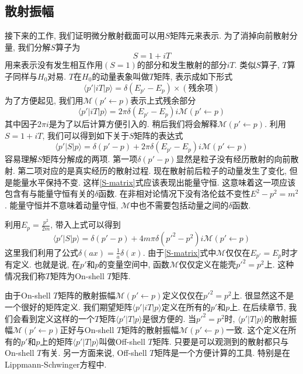 \documentclass[a4paper,11pt]{book}
\begin{document}
\subsection{散射振幅}
接下来的工作, 我们证明微分散射截面可以用$S$矩阵元来表示. 为了消掉向前散射分量, 我们分解$S$算子为
\begin{equation}
  S=1+iT
\end{equation}
用来表示没有发生相互作用$(S=1)$的部分和发生散射的部分$iT$. 类似$S$算子, $T$算子同样与$H_0$对易. $T$在$H_0$的动量表象叫做$T$矩阵, 表示成如下形式
\begin{equation}
  \langle p'|iT|p\rangle=\delta(E_{p'}-E_p)\times (\text{残余项})
\end{equation}
为了方便起见, 我们用$\mathcal{M}(p'\leftarrow p)$表示上式残余部分
\begin{equation}
  \langle p'|iT|p\rangle=2\pi\delta(E_{p'}-E_p)i\mathcal{M}(p'\leftarrow p)
\end{equation}
其中因子$2\pi i$是为了以后计算方便引入的. 稍后我们将会解释$\mathcal{M}(p'\leftarrow p)$. 利用$S=1+iT$, 我们可以得到如下关于$S$矩阵的表达式
\begin{equation}\label{S-matrix}
  \langle p'|S|p\rangle=\delta(p'-p)+2\pi \delta(E_{p'}-E_p)i\mathcal{M}(p'\leftarrow p)
\end{equation}
容易理解$S$矩阵分解成的两项. 第一项$\delta(p'-p)$显然是粒子没有经历散射的向前散射. 第二项对应的是真实经历的散射过程. 现在散射前后粒子的动量发生了变化, 但是能量水平保持不变. 这样\eqref{S-matrix}式应该表现出能量守恒. 这意味着这一项应该包含有与能量守恒有关的$\delta$函数. 在非相对论情况下没有洛伦兹不变性$E^2-p^2=m^2$. 能量守恒并不意味着动量守恒, $\mathcal{M}$中也不需要包括动量之间的$\delta$函数.

利用$E_p=\frac{p^2}{2m}$, 带入上式可以得到
\begin{equation}
  \langle p'|S|p\rangle=\delta(p'-p)+4m\pi \delta(p'^2-p^2)i\mathcal{M}(p'\leftarrow p)
\end{equation}
这里我们利用了公式$\delta(ax)=\frac{1}{a}\delta(x)$. 由于\eqref{S-matrix}式中$\mathcal{M}$仅仅在$E_{p'}=E_p$时才有定义. 也就是说, 在$p'$和$p$的变量空间中, 函数$\mathcal{M}$仅仅定义在能壳$p'^2=p^2$上. 这种情况我们称$T$矩阵为On-shell $T$矩阵.

由于On-shell $T$矩阵的散射振幅$\mathcal{M}(p'\leftarrow p)$定义仅仅在$p'^2=p^2$上. 很显然这不是一个很好的矩阵定义. 我们期望矩阵$\langle p'|iT|p\rangle$定义在所有的$p'$和$p$上. 在后续章节, 我们会看到定义这样的一个$T$矩阵$\langle p'|T|p\rangle$是很方便的. 当$p'^2=p^2$时, $\langle p'|T|p\rangle$的散射振幅$\mathcal{M}(p'\leftarrow p)$正好与On-shell $T$矩阵的散射振幅$\mathcal{M}(p'\leftarrow p)$一致. 这个定义在所有的$p'$和$p$上的矩阵$\langle p'|T|p\rangle$叫做Off-shell $T$矩阵. 只要是可以观测到的散射都只与On-shell $T$有关. 另一方面来说, Off-shell $T$矩阵是一个方便计算的工具. 特别是在Lippmann-Schwinger方程中.
\end{document}
